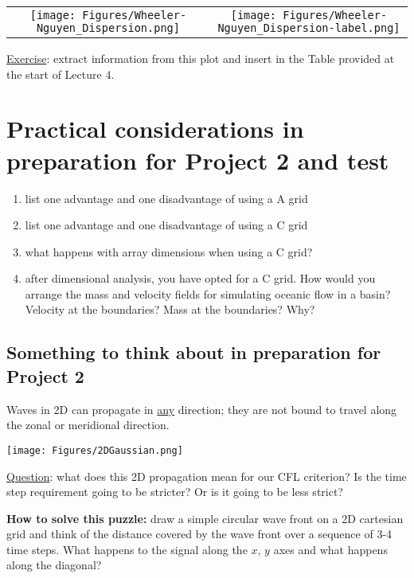 \begin{center}
	\begin{tabular}{cc}
		\texttt{[image: Figures/Wheeler-Nguyen\_Dispersion.png]} &
		\texttt{[image: Figures/Wheeler-Nguyen\_Dispersion-label.png]}
	\end{tabular}
\end{center}

\underline{Exercise}: extract information from this plot and insert in the Table provided at the start of Lecture 4.

\section{Practical considerations in preparation for Project 2 and test}
\begin{enumerate}
	\item list one advantage and one disadvantage of using a A grid
	\item list one advantage and one disadvantage of using a C grid
	\item what happens with array dimensions when using a C grid?
	\item after dimensional analysis, you have opted for a C grid. How would you arrange the mass and velocity fields for simulating oceanic flow in a basin?
	Velocity at the boundaries? Mass at the boundaries? Why?
\end{enumerate}


\subsection{Something to think about in preparation for Project 2}
Waves in 2D can propagate in \underline{any} direction; they are not bound to travel along the zonal or meridional direction.

\begin{center}
	\texttt{[image: Figures/2DGaussian.png]}
\end{center}


\underline{Question}: what does this 2D propagation mean for our CFL criterion? Is the time step requirement going to be stricter? Or is it going to be less strict?

\medskip

{\bf How to solve this puzzle:} draw a simple circular wave front on a 2D cartesian grid and think of the distance covered by the wave front over a sequence of 3-4 time steps.
What happens to the signal along the $x$, $y$ axes and what happens along the diagonal?

